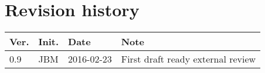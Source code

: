 \chapter*{Revision history}
\label{app:rev_his}


\begin{tabular}{b{1cm} b{1cm} b{2cm} b{8cm}}
    \textbf{Ver.} & \textbf{Init.} & \textbf{Date} & \textbf{Note} \\
    \hline
    0.9 & JBM & 2016-02-23 & First draft ready external review \\
\end{tabular}
